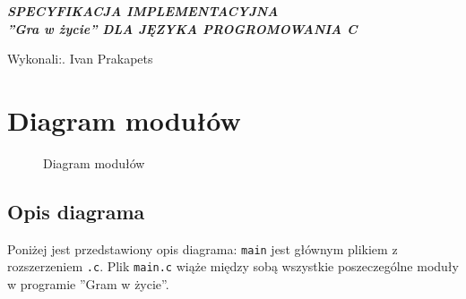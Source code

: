 \documentclass[a4paper, 12pt]{article}
\newcommand{\mainmatter}{\clearpage \cfoot{\thepage\ of \pageref{LastPage}}
\pagenumbering{arabic}}
\begin{document}
	\begin{titlepage}
		
		\begin{center}
    	\vspace{5cm}
    		\Large\textit{\textbf{SPECYFIKACJA IMPLEMENTACYJNA 
    		\\''Gra w życie'' DLA JĘZYKA PROGROMOWANIA C}}\\ 
		\vspace{15cm}
		\end{center} 

		\hfill\begin{minipage}{0.5\textwidth}
			\Large Wykonali:. Ivan Prakapets \newline
		\vspace{\baselineskip}
		\end{minipage}
		

	\end{titlepage}
\newpage
\mainmatter
\setlength{\headheight}{15pt}
\doublespacing
\tableofcontents
\newpage

	\section{Diagram modułów}
		\begin{figure}[h]
			\caption{Diagram modułów}
		\end{figure}		
			\hspace*{1cm} \newline
			\subsection{Opis diagrama} 
			\hspace*{1cm} Poniżej jest przedstawiony opis diagrama:\newline
			\texttt{main} jest głównym plikiem z rozszerzeniem \texttt{.c}. Plik \texttt{main.c} wiąże między sobą wszystkie poszeczególne moduły w programie ''Gram w życie''. 
\newpage
\end{document}
